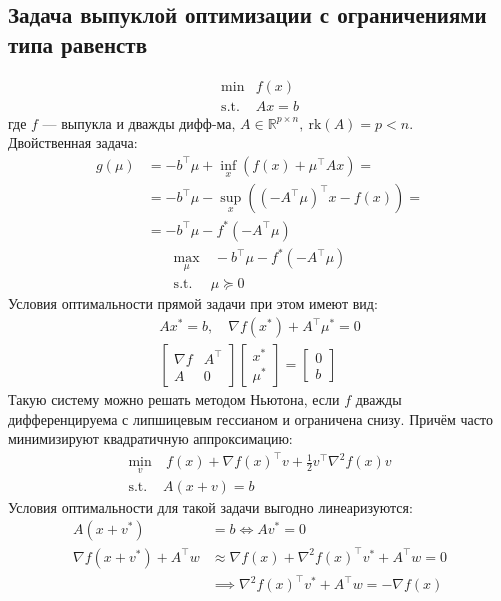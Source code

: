 \documentclass[11pt,a4paper]{report}
\def\Real{\mathbb{R}}
\theoremstyle{definition}
\theoremstyle{definition}
\theoremstyle{definition}
\begin{document}
	\subsection{Задача выпуклой оптимизации с ограничениями типа равенств}
	\begin{align*}
		\min& f(x)\\
		\text{s.t. }& Ax = b
	\end{align*}
	где $f$ — выпукла и дважды дифф-ма, $ A \in \Real^{p \times n},\ \mathrm{rk} (A) = p < n $.\\
	Двойственная задача:
	\begin{align*}
		g(\mu) &= -b^\top \mu + \inf_{x}(f(x) + \mu^\top A x) =\\
					 &= -b^\top \mu - \sup_{x}((-A^\top \mu)^\top x - f(x)) =\\
					 &= -b^\top \mu - f^{*}(-A^\top \mu)
	\end{align*}
	\begin{align*}
		\max_{\mu}&\ -b^\top \mu - f^*(-A^\top \mu)\\
		\text{s.t. }& \mu \succeq 0
	\end{align*}
	Условия оптимальности прямой задачи при этом имеют вид:
	\begin{gather*}
		Ax^* = b,\quad \nabla f(x^*) + A^\top \mu^* = 0\\
		\begin{bmatrix}
			\nabla f & A^\top\\
			A & 0
		\end{bmatrix} \begin{bmatrix}
			x^*\\
			\mu^* 
		\end{bmatrix} = 
		\begin{bmatrix}
			0\\
			b
		\end{bmatrix}
	\end{gather*}
	Такую систему можно решать методом Ньютона, если $ f $ дважды дифференцируема с липшицевым гессианом и ограничена снизу. Причём часто минимизируют квадратичную аппроксимацию:
	\begin{align*}
		\min_{v}&\ f(x) + \nabla f(x)^{\top} v + \frac{1}{2} v^{\top} \nabla^2 f(x) v\\
		\text{s.t. }& A(x + v) = b
	\end{align*}
	Условия оптимальности для такой задачи выгодно линеаризуются:
	\begin{align*}
		A(x + v^*) &= b \iff Av^* = 0\\
		\nabla f(x + v^*) + A^\top w &\approx \nabla f(x) + \nabla^2 f(x)^{\top} v^* + A^\top w = 0\\
		&\implies \nabla^2 f(x)^{\top} v^* + A^\top w = -\nabla f(x)
 	\end{align*}
\end{document}
